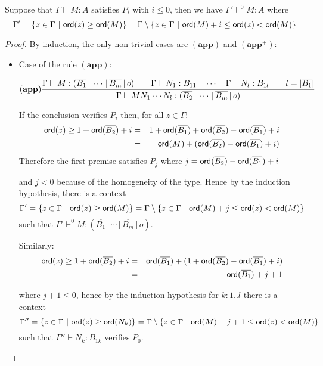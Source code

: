 \begin{lem}
\label{lem:restriction}

Suppose that $\Gamma \vdash M : A$ satisfies $P_i$ with $i\leq0$, then we have
$\Gamma' \vdash^{0} M : A$ where $$\Gamma' = \{ z \in \Gamma \ |
\ \ord{z} \geq \ord{M} \} = \Gamma \setminus \{ z \in \Gamma \ | \ \ord{M} + i \leq \ord{z} < \ord{M} \}$$
\end{lem}
\begin{proof}
By induction, the only non trivial cases are $\mathbf{(app)}$ and $\mathbf{(app^+)}$:
\begin{itemize}
\item Case of the rule $\mathbf{(app)}$:

    \[ (\mathbf{app})
    {{{{\Gamma} \vdash {M : (\overline{B_1} \, | \, \cdots \, | \, \overline{B_m} \, | \, o)}} \qquad
    {{\Gamma} \vdash {N_1 : B_{11}}} \quad \cdots \quad {{\Gamma} \vdash {N_{l} :
    B_{1l}}} \qquad l = |\overline{B_1}| } \over{ {{\Gamma} \vdash {M N_1
    \cdots N_{l} : (\overline{B_2} \, | \, \cdots \, | \,
    \overline{B_m} \, | \, o)}}}}
    \]

    If the conclusion verifies $P_i$ then, for all $z \in \Gamma$:
    \begin{eqnarray*}
    {\sf ord}(z) \geq 1 + {\sf ord}(\overline{B_2}) + i
    &=& 1 + {\sf ord}(\overline{B_1}) + {\sf ord}(\overline{B_2}) - {\sf ord}(\overline{B_1}) + i \\
    &=& {\sf ord}(M) + ({\sf ord}(\overline{B_2}) - {\sf ord}(\overline{B_1}) + i)
    \end{eqnarray*}
    Therefore the first premise satisfies $P_j$ where $j={{\sf ord}(\overline{B_2}) - {\sf ord}(\overline{B_1}) + i}$

    and $j< 0$ because of the homogeneity of the type. Hence by the induction hypothesis,
    there is a context $$\Gamma' = \{ z \in \Gamma \ |
    \ \ord{z} \geq \ord{M} \} = \Gamma \setminus \{ z \in \Gamma \ | \ \ord{M} + j \leq \ord{z} < \ord{M} \}$$
    such that $\Gamma' \vdash^{0} M : (\overline{B_1} \, | \, \cdots \, | \, \overline{B_m} \, | \, o)$.


    Similarly:
    \begin{eqnarray*}
    {\sf ord}(z) \geq 1 + {\sf ord}(\overline{B_2}) + i
    &=& {\sf ord}(\overline{B_1}) + (1+{\sf ord}(\overline{B_2}) - {\sf ord}(\overline{B_1}) + i) \\
    &=& {\sf ord}(\overline{B_1}) + j+1
    \end{eqnarray*}

    where $j+1\leq 0$, hence by the induction hypothesis for $k : 1..l$ there is a
    context $$\Gamma'' = \{ z \in \Gamma \ |
    \ \ord{z} \geq \ord{N_k} \} = \Gamma \setminus \{ z \in \Gamma \ | \ \ord{M} + j+1 \leq \ord{z} < \ord{M} \}$$
    such that $\Gamma'' \vdash N_k : B_{1k}$ verifies $P_0$.


\end{itemize}
\end{proof}
